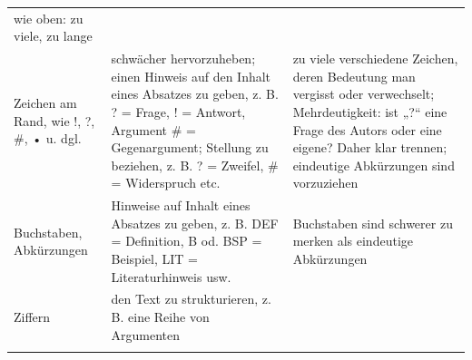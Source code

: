 \documentclass[]{book}
\theoremstyle{definition}
\theoremstyle{definition}
\theoremstyle{definition}
\theoremstyle{remark}
\begin{document}
\begin{longtable}[]{@{}lll@{}}
\begin{minipage}[t]{0.33\columnwidth}
wie oben: zu viele, zu lange\strut
\end{minipage}\tabularnewline
\begin{minipage}[t]{0.31\columnwidth}\raggedright\strut
Zeichen am Rand, wie !, ?, \#, • u. dgl.\strut
\end{minipage} & \begin{minipage}[t]{0.27\columnwidth}\raggedright\strut
schwächer hervorzuheben; einen Hinweis auf den Inhalt eines Absatzes zu
geben, z. B. ? = Frage, ! = Antwort, Argument \# = Gegenargument;
Stellung zu beziehen, z. B. ? = Zweifel, \# = Widerspruch etc.
\vspace{5mm}\strut
\end{minipage} & \begin{minipage}[t]{0.33\columnwidth}\raggedright\strut
zu viele verschiedene Zeichen, deren Bedeutung man vergisst oder
verwechselt; Mehrdeutigkeit: ist „?`` eine Frage des Autors oder eine
eigene? Daher klar trennen; eindeutige Abkürzungen sind vorzuziehen
\vspace{5mm}\strut
\end{minipage}\tabularnewline
\begin{minipage}[t]{0.31\columnwidth}\raggedright\strut
Buchstaben, Abkürzungen\strut
\end{minipage} & \begin{minipage}[t]{0.27\columnwidth}\raggedright\strut
Hinweise auf Inhalt eines Absatzes zu geben, z. B. DEF = Definition, B
od. BSP = Beispiel, LIT = Literaturhinweis usw. \vspace{5mm}\strut
\end{minipage} & \begin{minipage}[t]{0.33\columnwidth}\raggedright\strut
Buchstaben sind schwerer zu merken als eindeutige Abkürzungen
\vspace{5mm}\strut
\end{minipage}\tabularnewline
\begin{minipage}[t]{0.31\columnwidth}\raggedright\strut
Ziffern\strut
\end{minipage} & \begin{minipage}[t]{0.27\columnwidth}\raggedright\strut
den Text zu strukturieren, z. B. eine Reihe von Argumenten
\vspace{5mm}\strut
\end{minipage} & \begin{minipage}[t]{0.33\columnwidth}\raggedright\strut
\strut
\end{minipage}\tabularnewline
\begin{minipage}[t]{0.31\columnwidth}\raggedright\strut

\end{minipage}
\end{longtable}
\end{document}

